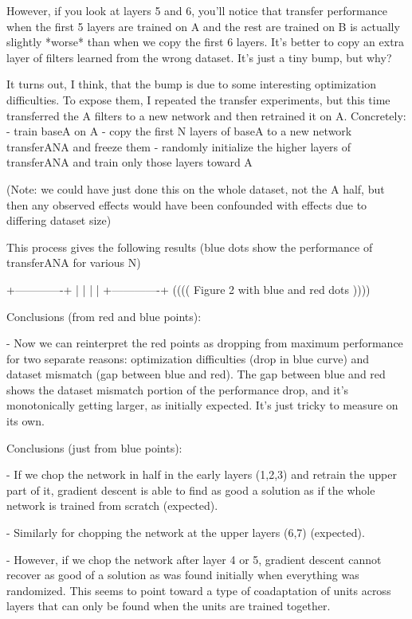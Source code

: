 However, if you look at layers 5 and 6, you'll notice that transfer performance when the first 5 layers are trained on A and the rest are trained on B is actually slightly *worse* than when we copy the first 6 layers. It's better to copy an extra layer of filters learned from the wrong dataset. It's just a tiny bump, but why?

It turns out, I think, that the bump is due to some interesting optimization difficulties. To expose them, I repeated the transfer experiments, but this time transferred the A filters to a new network and then retrained it on A. Concretely:
 - train baseA on A
 - copy the first N layers of baseA to a new network transferANA and freeze them
 - randomly initialize the higher layers of transferANA and train only those layers toward A

(Note: we could have just done this on the whole dataset, not the A half, but then any observed effects would have been confounded with effects due to differing dataset size)

This process gives the following results (blue dots show the performance of transferANA for various N)

+-------------+
|                    |
|                    |
+-------------+
(((( Figure 2 with blue and red dots ))))

Conclusions (from red and blue points):

 - Now we can reinterpret the red points as dropping from maximum performance for two separate reasons: optimization difficulties (drop in blue curve) and dataset mismatch (gap between blue and red). The gap between blue and red shows the dataset mismatch portion of the performance drop, and it's monotonically getting larger, as initially expected. It's just tricky to measure on its own.


Conclusions (just from blue points):

 - If we chop the network in half in the early layers (1,2,3) and retrain the upper part of it, gradient descent is able to find as good a solution as if the whole network is trained from scratch (expected).

 - Similarly for chopping the network at the upper layers (6,7) (expected).

 - However, if we chop the network after layer 4 or 5, gradient descent cannot recover as good of a solution as was found initially when everything was randomized. This seems to point toward a type of coadaptation of units across layers that can only be found when the units are trained together.

